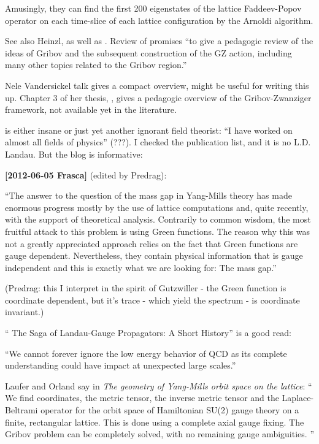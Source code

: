 \begin{description}
Amusingly, they can find the first 200 eigenstates of the lattice
Faddeev-Popov operator on each time-slice of each lattice configuration
by the Arnoldi algorithm.

See also Heinzl, as well as
.
Review of  promises ``to give a pedagogic review of the
ideas of Gribov and the subsequent construction of the GZ action,
including many other topics related to the Gribov region.''

Nele Vandersickel
{talk} gives a compact overview, might be useful for writing this up.
Chapter 3 of her thesis, , gives a pedagogic overview of
the Gribov-Zwanziger framework, not available yet in the literature.

\item[2012-06-14 Predrag]
 is either insane
or just yet another ignorant field theorist: ``I have worked on almost
all fields of physics'' (???). I checked the publication list, and it is
no  L.D. Landau. But the blog is informative:

{\bf [2012-06-05 Frasca]} (edited by Predrag):

``The answer to the question of the mass gap in Yang-Mills theory has
made enormous progress mostly by the use of lattice computations and,
quite recently, with the support of theoretical analysis. Contrarily to
common wisdom, the most fruitful attack to this problem is using Green
functions. The reason why this was not a greatly appreciated approach
relies on the fact that Green functions are gauge dependent.
Nevertheless, they contain physical information that is gauge independent
and this is exactly what we are looking for: The mass gap.''

(Predrag: this I interpret in the spirit of Gutzwiller - the Green function
is coordinate dependent, but it's trace - which yield the spectrum - is
coordinate invariant.)

``
{The Saga of Landau-Gauge Propagators: A Short History}'' is a good read:

``We cannot forever ignore the low energy behavior of QCD as its complete
understanding could have impact at unexpected large scales.''

\item[2012-06-15 Predrag]
Laufer and Orland say in
{\em The geometry of {Yang-Mills} orbit space on the lattice}: ``
We find coordinates, the metric tensor, the inverse metric tensor and the
Laplace-Beltrami operator for the orbit space of Hamiltonian SU(2) gauge
theory on a finite, rectangular lattice. This is done using a complete
axial gauge fixing. The Gribov problem can be completely solved, with no
remaining gauge ambiguities.
''


\end{description}

